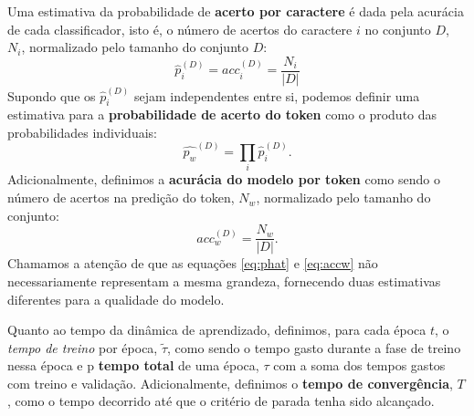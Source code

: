Uma estimativa da probabilidade de \textbf{acerto por caractere} é dada pela acurácia de cada classificador, isto é, o número de acertos do caractere $i$ no conjunto $D$, $N_i$, normalizado pelo tamanho do conjunto $D$: 
\begin{equation}
	\hat{p}_i^{(D)} = acc_i^{(D)} = \frac{N_i}{|D|}
\end{equation}
Supondo que os $\hat{p}_i^{(D)}$ sejam independentes entre si, podemos definir uma estimativa para a \textbf{probabilidade de acerto do token} como o produto das probabilidades individuais:
\begin{equation} \label{eq:phat}
	\hat{p_w}^{(D)} = \prod_{i} \hat{p}_i^{(D)}.
\end{equation}
Adicionalmente, definimos a \textbf{acurácia do modelo por token} como sendo o número de acertos na predição do token, $N_w$, normalizado pelo tamanho do conjunto:
\begin{equation} \label{eq:accw}
	acc_w^{(D)} = \frac{N_w}{|D|}.
\end{equation}
Chamamos a atenção de que as equações \ref{eq:phat} e \ref{eq:accw} não necessariamente representam a mesma grandeza, fornecendo duas estimativas diferentes para a qualidade do modelo.

Quanto ao tempo da dinâmica de aprendizado, definimos, para cada época $t$, o \textit{tempo de treino} por época, $\tilde{\tau}$, como sendo o tempo gasto durante a fase de treino nessa época e p \textbf{tempo total} de uma época, $\tau$ com a soma dos tempos gastos com treino e validação. Adicionalmente, definimos o \textbf{tempo de convergência}, $T$, como o tempo decorrido até que o critério de parada tenha sido alcançado.